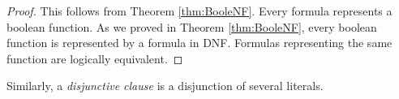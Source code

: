 

\setcounter{section}{1}
\setcounter{subsection}{5}
\setcounter{dfn}{17}

\begin{proof}
This follows from Theorem \ref{thm:BooleNF}.
Every formula represents a boolean function.
As we proved in Theorem \ref{thm:BooleNF}, every boolean function is represented by a formula in DNF.
Formulas representing the same function are logically equivalent.
\end{proof}

Similarly, a \emph{disjunctive clause} is a disjunction of several literals.


